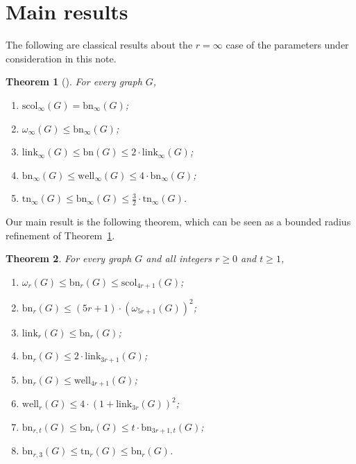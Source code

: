 \documentclass[final]{dmtcs-episciences}
\newtheorem{thm}{Theorem}
\theoremstyle{definition}
\theoremstyle{remark}
\newcommand{\scol}{\ensuremath{\mathrm{scol}}}
\newcommand{\tangle}{\ensuremath{\mathrm{tn}}}
\newcommand{\bn}{\ensuremath{\mathrm{bn}}}
\newcommand{\link}{\ensuremath{\mathrm{link}}}
\newcommand{\WL}{\ensuremath{\mathrm{well}}}
\renewcommand{\leq}{\leqslant}
\renewcommand{\geq}{\geqslant}
\begin{document}
\section{Main results}\label{sec:res}


The following are classical results about the $r=\infty$ case of the parameters under consideration in this note. 

\begin{thm}[\cite{Reed, RobertsonSeymourX}]\label{thm:summaryliterature}
For every graph $G$,
\begin{enumerate}[label={\rm{(\roman*)}},itemsep=0pt, parsep=0pt, before=\setlength{\baselineskip}{8mm}]
\item $\scol_{\infty}(G)=\bn_{\infty}(G)$;
\item $\omega_{\infty}(G) \leq \bn_{\infty}(G)$;
\item $\link_{\infty}(G)\leq \bn(G)\leq 2\cdot \link_{\infty}(G)$;
\item $\bn_{\infty}(G)\leq \WL_{\infty}(G)\leq 4\cdot \bn_{\infty}(G)$;
\item $\tangle_{\infty}(G) \leq \bn_{\infty}(G)\leq \frac{3}{2}\cdot \tangle_{\infty}(G)$.
\end{enumerate}
\end{thm}

\medskip
Our main result is the following theorem, which can be seen as a bounded radius refinement of Theorem~\ref{thm:summaryliterature}. 

\begin{thm}\label{thm:summaryresults}
For every graph $G$ and all integers $r\geq 0$ and $t\geq 1$,
\begin{enumerate}[label={\rm{(\roman*)}},itemsep=0pt, parsep=0pt, before=\setlength{\baselineskip}{8mm}]
\item \label{item:one} $\omega_r(G)\leq \bn_r(G)\leq \scol_{4r+1}(G)$;
\item $ \bn_r(G) \leq (5r+1)\cdot (\omega_{5r+1}(G))^2$;
\item $\link_r(G) \leq \bn_r(G)$;
\item $\bn_r(G) \leq 2 \cdot \link_{3r+1}(G)$;
\item $\bn_r(G) \leq \WL_{4r+1}(G)$;
\item $\WL_r(G) \leq 4 \cdot (1+\link_{3r}(G))^2$;
\item $\bn_{r,t}(G) \leq \bn_r(G) \leq t \cdot \bn_{3r+1,t}(G)$;
\item $\bn_{r,3}(G) \leq \tangle_r(G) \leq \bn_r(G)$.
\end{enumerate}
\end{thm}
\end{document}
